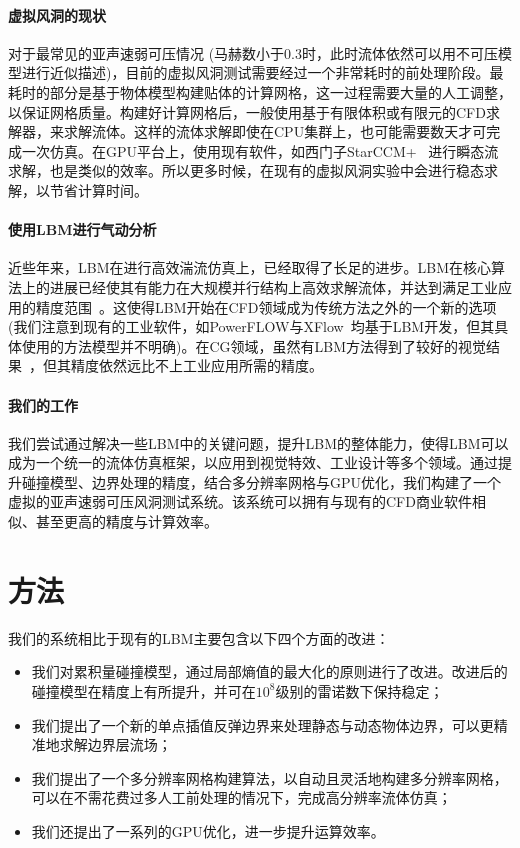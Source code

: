 \paragraph{虚拟风洞的现状}
对于最常见的亚声速弱可压情况 (马赫数小于0.3时，此时流体依然可以用不可压模型进行近似描述)，目前的虚拟风洞测试需要经过一个非常耗时的前处理阶段。最耗时的部分是基于物体模型构建贴体的计算网格，这一过程需要大量的人工调整，以保证网格质量。构建好计算网格后，一般使用基于有限体积或有限元的CFD求解器，来求解流体。这样的流体求解即使在CPU集群上，也可能需要数天才可完成一次仿真。在GPU平台上，使用现有软件，如西门子StarCCM+~\cite{Siemens} 进行瞬态流求解，也是类似的效率。所以更多时候，在现有的虚拟风洞实验中会进行稳态求解，以节省计算时间。

\paragraph{使用LBM进行气动分析}
近些年来，LBM在进行高效湍流仿真上，已经取得了长足的进步。LBM在核心算法上的进展已经使其有能力在大规模并行结构上高效求解流体，并达到满足工业应用的精度范围~\cite{Li-2020,Lallemand:2021}。这使得LBM开始在CFD领域成为传统方法之外的一个新的选项 (我们注意到现有的工业软件，如PowerFLOW与XFlow~\cite{Simulia}均基于LBM开发，但其具体使用的方法模型并不明确)。在CG领域，虽然有LBM方法得到了较好的视觉结果~\cite{Li-2020}，但其精度依然远比不上工业应用所需的精度。

\paragraph{我们的工作}
我们尝试通过解决一些LBM中的关键问题，提升LBM的整体能力，使得LBM可以成为一个统一的流体仿真框架，以应用到视觉特效、工业设计等多个领域。通过提升碰撞模型、边界处理的精度，结合多分辨率网格与GPU优化，我们构建了一个虚拟的亚声速弱可压风洞测试系统。该系统可以拥有与现有的CFD商业软件相似、甚至更高的精度与计算效率。

\section{方法}
我们的系统相比于现有的LBM主要包含以下四个方面的改进：
\begin{itemize}
	\item 我们对累积量碰撞模型，通过局部熵值的最大化的原则进行了改进。改进后的碰撞模型在精度上有所提升，并可在$10^8$级别的雷诺数下保持稳定； 
	\item 我们提出了一个新的单点插值反弹边界来处理静态与动态物体边界，可以更精准地求解边界层流场；
	\item 我们提出了一个多分辨率网格构建算法，以自动且灵活地构建多分辨率网格，可以在不需花费过多人工前处理的情况下，完成高分辨率流体仿真；
	\item 我们还提出了一系列的GPU优化，进一步提升运算效率。
\end{itemize}

